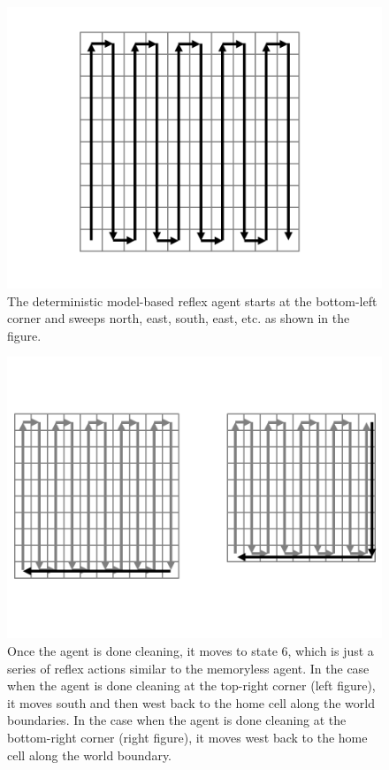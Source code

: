 \begin{figure}[!t]
	\centering
	\includegraphics[scale=.30]{img/3-motion.png}
	\caption{The deterministic model-based reflex agent starts at the bottom-left corner and sweeps north, east, south, east, etc. as shown in the figure.}
	\label{fig:motion}
\end{figure}

\begin{figure}[!t]
	\centering
	\includegraphics[scale=.30]{img/3-motionend.png}
	\caption{Once the agent is done cleaning, it moves to state 6, which is just a series of reflex actions similar to the memoryless agent. In the case when the agent is done cleaning at the top-right corner (left figure), it moves south and then west back to the home cell along the world boundaries. In the case when the agent is done cleaning at the bottom-right corner (right figure), it moves west back to the home cell along the world boundary.}
\end{figure}

